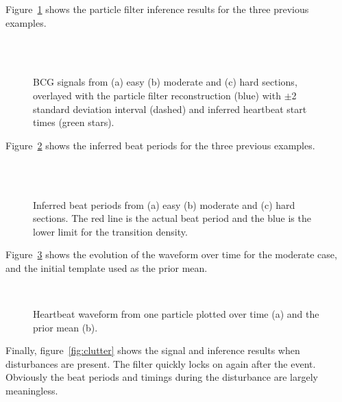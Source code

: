 \documentclass{article}
\begin{document}
Figure~\ref{fig:timing} shows the particle filter inference results for the three previous examples.
%
\begin{figure}
\centering
{} \\
 \\
\caption{BCG signals from (a) easy (b) moderate and (c) hard sections, overlayed with the particle filter reconstruction (blue) with $\pm$2 standard deviation interval (dashed) and inferred heartbeat start times (green stars).}
\label{fig:timing}
\end{figure}

Figure~\ref{fig:periods} shows the inferred beat periods for the three previous examples.
%
\begin{figure}
\centering
{} \\
 \\
\caption{Inferred beat periods from (a) easy (b) moderate and (c) hard sections. The red line is the actual beat period and the blue is the lower limit for the transition density.}
\label{fig:periods}
\end{figure}

Figure~\ref{fig:template} shows the evolution of the waveform over time for the moderate case, and the initial template used as the prior mean.

\begin{figure}
\centering
{} \\
\caption{Heartbeat waveform from one particle plotted over time (a) and the prior mean (b).}
\label{fig:template}
\end{figure}

Finally, figure~\ref{fig:clutter} shows the signal and inference results when disturbances are present. The filter quickly locks on again after the event. Obviously the beat periods and timings during the disturbance are largely meaningless.
\end{document}
